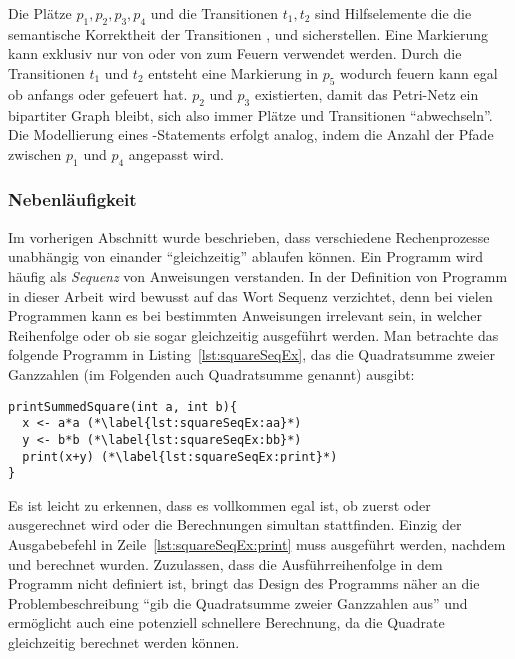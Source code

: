 Die Plätze $p_1,p_2,p_3,p_4$ und die Transitionen $t_1,t_2$ sind Hilfselemente die die semantische Korrektheit der Transitionen ,  und  sicherstellen. Eine Markierung kann exklusiv nur von  oder von  zum Feuern verwendet werden. Durch die Transitionen $t_1$ und $t_2$ entsteht eine Markierung in $p_5$ wodurch  feuern kann egal ob anfangs  oder  gefeuert hat. $p_2$ und $p_3$ existierten, damit das Petri-Netz ein bipartiter Graph bleibt, sich also immer Plätze und Transitionen \enquote{abwechseln}. Die Modellierung eines -Statements erfolgt analog, indem die Anzahl der Pfade zwischen $p_1$ und $p_4$ angepasst wird.

\subsubsection{Nebenläufigkeit}\label{sec:nebenl}
Im vorherigen Abschnitt wurde beschrieben, dass verschiedene Rechenprozesse unabhängig von einander \enquote{gleichzeitig} ablaufen können. Ein Programm wird häufig als \emph{Sequenz} von Anweisungen verstanden. In der Definition von Programm in dieser Arbeit wird bewusst auf das Wort Sequenz verzichtet, denn bei vielen Programmen kann es bei bestimmten Anweisungen irrelevant sein, in welcher Reihenfolge oder ob sie sogar gleichzeitig ausgeführt werden. Man betrachte das folgende Programm in Listing~\vref{lst:squareSeqEx}, das die Quadratsumme zweier Ganzzahlen (im Folgenden auch Quadratsumme genannt) ausgibt: 
\begin{lstlisting}[caption={[Beispiel eines Programms das sequentiell die Summe von Quadraten zweier Ganzzahlen berechnet.]Beispiel eines Programms das die Summe von Quadraten zweier Ganzzahlen berechnet. Die Berechnung der Quadratzahlen wird nacheinander in einer fest definierten Sequenz durchgeführt.}, label={lst:squareSeqEx}]
printSummedSquare(int a, int b){
  x <- a*a (*\label{lst:squareSeqEx:aa}*)
  y <- b*b (*\label{lst:squareSeqEx:bb}*)
  print(x+y) (*\label{lst:squareSeqEx:print}*)
}
\end{lstlisting}
Es ist leicht zu erkennen, dass es vollkommen egal ist, ob zuerst  oder  ausgerechnet wird oder die Berechnungen simultan stattfinden. Einzig der Ausgabebefehl in Zeile~\ref{lst:squareSeqEx:print} muss ausgeführt werden, nachdem  und  berechnet wurden. Zuzulassen, dass die Ausführreihenfolge in dem Programm nicht definiert ist, bringt das Design des Programms näher an die Problembeschreibung \enquote{gib die Quadratsumme zweier Ganzzahlen aus} und ermöglicht auch eine potenziell schnellere Berechnung, da die Quadrate gleichzeitig berechnet werden können.

